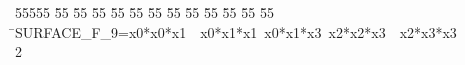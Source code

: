 %
%
\begin{tabbing}
55555 \= 55 \= 55 \= 55 \= 55 \= 55 \= 55 \= 55 \= 55 \= 55 \= 55 \= 55 \= 55 \= \>SURFACE\_F\_9=x0*x0*x1\ \ x0*x1*x1\ x0*x1*x3\ x2*x2*x3\ \ x2*x3*x3\\[0pt]
2\>\end{tabbing}
